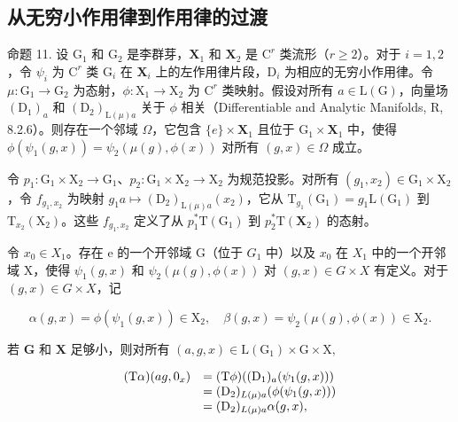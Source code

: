 \subsection{从无穷小作用律到作用律的过渡}

命题 11. 设 \(\mathrm{G}_1\) 和 \(\mathrm{G}_2\) 是李群芽，\(\mathbf{X}_1\) 和 \(\mathbf{X}_2\) 是 \(\mathrm{C}^r\) 类流形（\(r \geqslant 2\)）。对于 \(i = 1, 2\)，令 \(\psi_i\) 为 \(\mathrm{C}^r\) 类 \(\mathrm{G}_i\) 在 \(\mathbf{X}_i\) 上的左作用律片段，\(\mathrm{D}_i\) 为相应的无穷小作用律。令 \(\mu: \mathrm{G}_1 \to \mathrm{G}_2\) 为态射，\(\phi: \mathrm{X}_1 \to \mathrm{X}_2\) 为 \(\mathrm{C}^r\) 类映射。假设对所有 \(a \in \mathrm{L}(\mathrm{G})\)，向量场 \((\mathrm{D}_{1})_a\) 和 \((\mathrm{D}_{2})_{\mathrm{L}(\mu)a}\) 关于 \(\phi\) 相关（Differentiable and Analytic Manifolds, R, 8.2.6）。则存在一个邻域 \(\Omega\)，它包含 \(\{e\} \times \mathbf{X}_1\) 且位于 \(\mathrm{G}_1 \times \mathbf{X}_1\) 中，使得 \(\phi(\psi_1(g,x)) = \psi_2(\mu(g),\phi(x))\) 对所有 \((g,x) \in \Omega\) 成立。

令 \(p_1: \mathrm{G}_1 \times \mathrm{X}_2 \to \mathrm{G}_1\)、\(p_2: \mathrm{G}_1 \times \mathrm{X}_2 \to \mathrm{X}_2\) 为规范投影。对所有 \((g_1, x_2) \in \mathrm{G}_1 \times \mathrm{X}_2\)，令 \(f_{g_1, x_2}\) 为映射 \(g_1 a \mapsto (\mathrm{D}_2)_{\mathrm{L}(\mu)a}(x_2)\)，它从 \(\mathrm{T}_{g_1}(\mathrm{G}_1) = g_1\mathrm{L}(\mathrm{G}_1)\) 到 \(\mathrm{T}_{x_2}(\mathrm{X}_2)\)。这些 \(f_{g_1, x_2}\) 定义了从 \(p_1^* \mathrm{T}(\mathrm{G}_1)\) 到 \(p_2^* \mathrm{T}(\mathbf{X}_2)\) 的态射。

令 \(x_0 \in X_1\)。存在 e 的一个开邻域 G（位于 \(G_1\) 中）以及 \(x_0\) 在 \(X_1\) 中的一个开邻域 X，使得 \(\psi_1(g, x)\) 和 \(\psi_2(\mu(g), \phi(x))\) 对 \((g, x) \in G \times X\) 有定义。对于 \((g, x) \in G \times X\)，记

\[
\alpha (g, x) = \phi (\psi_ {1} (g, x)) \in \mathrm{X} _ {2}, \quad \beta (g, x) = \psi_ {2} (\mu (g), \phi (x)) \in \mathrm{X} _ {2}.
\]

若 \(\mathbf{G}\) 和 \(\mathbf{X}\) 足够小，则对所有 \((a,g,x)\in \mathrm{L}(\mathrm{G}_1)\times \mathrm{G}\times \mathrm{X},\)

\[
\begin{array}{r l} (\mathrm{T} \alpha) (a g, 0 _ {x}) & = (\mathrm{T} \phi) ((\mathrm{D} _ {1}) _ {a} (\psi_ {1} (g, x))) \\ & = (\mathrm{D} _ {2}) _ {L (\mu) a} (\phi (\psi_ {1} (g, x))) \\ & = (\mathrm{D} _ {2}) _ {L (\mu) a} \alpha (g, x), \end{array}
\]


